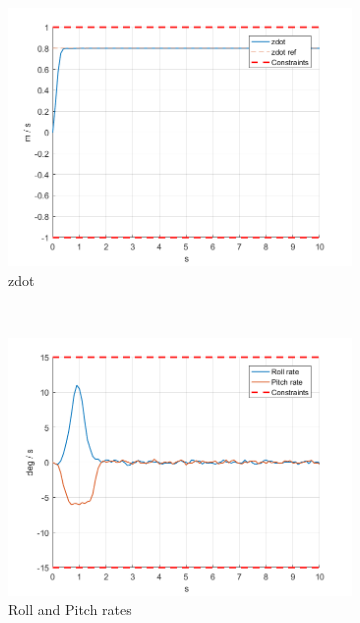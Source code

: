 \documentclass[11pt]{article}
\begin{document}
\begin{enumerate}
\begin{figure}[ht]
        \begin{subfigure}[c]{0.3\linewidth}
            \centering
            \includegraphics[width=\linewidth]{Plots_14_SlewRateConstraints/04}
            \caption{zdot}
        \end{subfigure}
        ~
        \begin{subfigure}[c]{0.3\linewidth}
            \centering
            \includegraphics[width=\linewidth]{Plots_14_SlewRateConstraints/05}
            \caption{Roll and Pitch rates}
        \end{subfigure}
        ~
        \begin{subfigure}[c]{0.3\linewidth}
            \centering

\end{subfigure}
\end{figure}
\end{enumerate}
\end{document}
